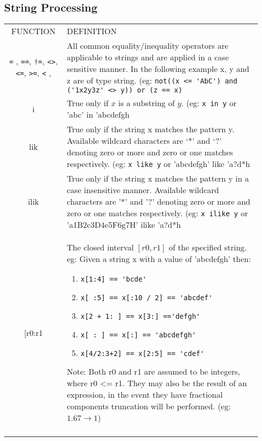 \subsection{String Processing}

\begin{tabular}{|c|p{}|}
\hline 
FUNCTION & DEFINITION\tabularnewline
\verb'=' , \verb'==', \verb'!=', \verb'<>', \verb'<=', \verb'>=',
\verb'<' ,  & All common equality/inequality operators are applicable to strings
and are applied in a case sensitive manner. In the following example
x, y and z are of type string. (eg: \verb"not((x <= 'AbC') and ('1x2y3z' <> y)) or (z == x)"\tabularnewline
i & True only if $x$ is a substring of $y$. (eg: \verb'x in y' or 'abc'
in 'abcdefgh\tabularnewline
lik & True only if the string x matches the pattern y. Available wildcard
characters are `{*}' and `?' denoting zero or more and zero or one
matches respectively. (eg: \verb'x like y' or 'abcdefgh' like 'a?d{*}h\tabularnewline
ilik & True only if the string x matches the pattern y in a case insensitive
manner. Available wildcard characters are '{*}' and '?' denoting zero
or more and zero or one matches respectively. (eg: \verb'x ilike y'
or 'a1B2c3D4e5F6g7H' ilike 'a?d{*}h\tabularnewline
{[}r0:r1 & The closed interval $[r0,r1]$ of the specified string. eg: Given
a string x with a value of 'abcdefgh' then: 
\begin{enumerate}
\item \verb"x[1:4] == 'bcde'" 
\item \verb"x[ :5] == x[:10 / 2] == 'abcdef'" 
\item \verb"x[2 + 1: ] == x[3:] =='defgh'" 
\item \verb"x[ : ] == x[:] == 'abcdefgh'" 
\item \verb"x[4/2:3+2] == x[2:5] == 'cdef'" 
\end{enumerate}
Note: Both r0 and r1 are assumed to be integers, where r0 \textless =
r1. They may also be the result of an expression, in the event they
have fractional components truncation will be performed. (eg: $1.67\rightarrow1$)\tabularnewline
\hline 
 & \tabularnewline
\end{tabular}

